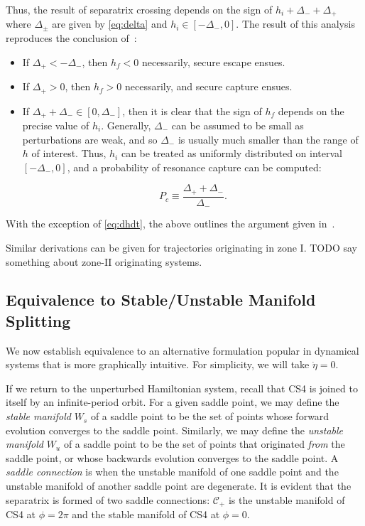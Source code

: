 \documentclass[
        fleqn,
        usenatbib,
    ]{mnras}
\begin{document}
Thus, the result of separatrix crossing depends on the sign of $h_i +
\Delta_- + \Delta_+$ where $\Delta_{\pm}$ are given by \autoref{eq:delta} and
$h_i \in [-\Delta_-, 0]$. The result of this analysis reproduces the conclusion
of~\cite{henrard1982}:
\begin{itemize}
    \item If $\Delta_+ < -\Delta_-$, then $h_f < 0$ necessarily, secure escape
        ensues.

    \item If $\Delta_+ > 0$, then $h_f > 0$ necessarily, and secure capture
        ensues.

    \item If $\Delta_+ + \Delta_- \in [0, \Delta_-]$, then it is clear that the
        sign of $h_f$ depends on the precise value of $h_i$. Generally,
        $\Delta_-$ can be assumed to be small as perturbations are weak, and
        so $\Delta_-$ is usually much smaller than the range of $h$ of interest.
        Thus, $h_i$ can be treated as uniformly distributed on interval
        $[-\Delta_-, 0]$, and a probability of resonance capture can be
        computed:

        \begin{equation}
            P_c \equiv \frac{\Delta_+ + \Delta_-}{\Delta_-}.
                \label{eq:p_c_gen}
        \end{equation}
\end{itemize}
With the exception of \autoref{eq:dhdt}, the above outlines the argument given
in~\cite{henrard1982}.

Similar derivations can be given for trajectories originating in zone I.
TODO say something about zone-II originating systems.

\subsection{Equivalence to Stable/Unstable Manifold Splitting}\label{ss:meln}

We now establish equivalence to an alternative formulation popular in dynamical
systems that is more graphically intuitive. For simplicity, we will take
$\dot{\eta} = 0$.

If we return to the unperturbed Hamiltonian system, recall that CS4 is joined to
itself by an infinite-period orbit. For a given saddle point, we may define the
\emph{stable manifold} $W_s$ of a saddle point to be the set of points whose
forward evolution converges to the saddle point. Similarly, we may define the
\emph{unstable manifold} $W_u$ of a saddle point to be the set of points that
originated \emph{from} the saddle point, or whose backwards evolution converges
to the saddle point. A \emph{saddle connection} is when the unstable manifold of
one saddle point and the unstable manifold of another saddle point are
degenerate. It is evident that the separatrix is formed of two saddle
connections: $\mathcal{C}_+$ is the unstable manifold of CS4 at $\phi = 2\pi$
and the stable manifold of CS4 at $\phi = 0$.
\end{document}
